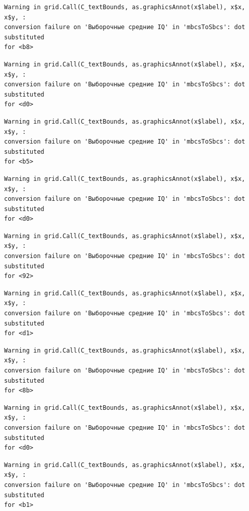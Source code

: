 \documentclass[
  letterpaper,
  DIV=11,
  numbers=noendperiod]{scrreprt}
\theoremstyle{definition}
\theoremstyle{remark}
\begin{document}
\begin{verbatim}
Warning in grid.Call(C_textBounds, as.graphicsAnnot(x$label), x$x, x$y, :
conversion failure on 'Выборочные средние IQ' in 'mbcsToSbcs': dot substituted
for <b8>
\end{verbatim}

\begin{verbatim}
Warning in grid.Call(C_textBounds, as.graphicsAnnot(x$label), x$x, x$y, :
conversion failure on 'Выборочные средние IQ' in 'mbcsToSbcs': dot substituted
for <d0>
\end{verbatim}

\begin{verbatim}
Warning in grid.Call(C_textBounds, as.graphicsAnnot(x$label), x$x, x$y, :
conversion failure on 'Выборочные средние IQ' in 'mbcsToSbcs': dot substituted
for <b5>
\end{verbatim}

\begin{verbatim}
Warning in grid.Call(C_textBounds, as.graphicsAnnot(x$label), x$x, x$y, :
conversion failure on 'Выборочные средние IQ' in 'mbcsToSbcs': dot substituted
for <d0>
\end{verbatim}

\begin{verbatim}
Warning in grid.Call(C_textBounds, as.graphicsAnnot(x$label), x$x, x$y, :
conversion failure on 'Выборочные средние IQ' in 'mbcsToSbcs': dot substituted
for <92>
\end{verbatim}

\begin{verbatim}
Warning in grid.Call(C_textBounds, as.graphicsAnnot(x$label), x$x, x$y, :
conversion failure on 'Выборочные средние IQ' in 'mbcsToSbcs': dot substituted
for <d1>
\end{verbatim}

\begin{verbatim}
Warning in grid.Call(C_textBounds, as.graphicsAnnot(x$label), x$x, x$y, :
conversion failure on 'Выборочные средние IQ' in 'mbcsToSbcs': dot substituted
for <8b>
\end{verbatim}

\begin{verbatim}
Warning in grid.Call(C_textBounds, as.graphicsAnnot(x$label), x$x, x$y, :
conversion failure on 'Выборочные средние IQ' in 'mbcsToSbcs': dot substituted
for <d0>
\end{verbatim}

\begin{verbatim}
Warning in grid.Call(C_textBounds, as.graphicsAnnot(x$label), x$x, x$y, :
conversion failure on 'Выборочные средние IQ' in 'mbcsToSbcs': dot substituted
for <b1>
\end{verbatim}
\end{document}
